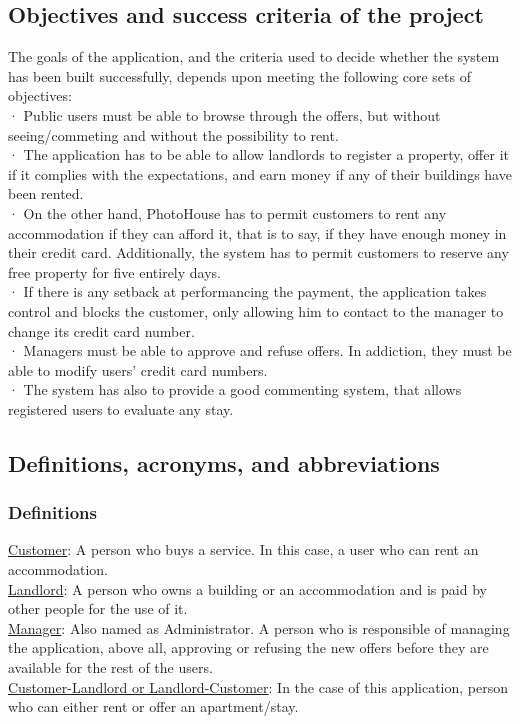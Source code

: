 \documentclass[12pt]{article}
\begin{document}
\subsection{Objectives and success criteria of the project}
The goals of the application, and the criteria used to decide whether the system has been built successfully, depends upon meeting the following core sets of objectives:\\
· Public users must be able to browse through the offers, but without seeing/commeting and without the possibility to rent.\\
· The application has to be able to allow landlords to register a property, offer it if it complies with the expectations, and earn money if any of their buildings have been rented.\\
· On the other hand, PhotoHouse has to permit customers to rent any accommodation if they can afford it, that is to say, if they have enough money in their credit card. Additionally, the system has to permit customers to reserve any free property for five entirely days.\\
· If there is any setback at performancing the payment, the application takes control and blocks the customer, only allowing him to contact to the manager to change its credit card number.\\
· Managers must be able to approve and refuse offers. In addiction, they must be able to modify users' credit card numbers.\\
· The system has also to provide a good commenting system, that allows registered users to evaluate any stay.\\


\subsection{Definitions, acronyms, and abbreviations}
\subsubsection{Definitions}
\underline{Customer}: A person who buys a service. In this case, a user who can rent an accommodation.\\
\underline{Landlord}: A person who owns a building or an accommodation and is paid by other people for the use of it.\\
\underline{Manager}: Also named as Administrator. A person who is responsible of managing the application, above all, approving or refusing the new offers before they are available for the rest of the users.\\
\underline{Customer-Landlord or Landlord-Customer}: In the case of this application, person who can either rent or offer an apartment/stay.
\end{document}

